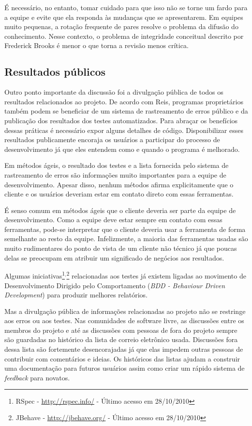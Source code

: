É necessário, no entanto, tomar cuidado para que isso não se torne um
fardo para a equipe e evite que ela responda às mudanças que se
apresentarem. Em equipes muito pequenas, a rotação frequente de pares
resolve o problema da difusão do conhecimento. Nesse contexto, o
problema de integridade conceitual descrito por Frederick Brooks
\cite{Brooks1975-mmme} é menor o que torna a revisão menos crítica.

\subsection{Resultados públicos}
\label{subsec:publicity}

Outro ponto importante da discussão foi a divulgação pública de todos
os resultados relacionados ao projeto. De acordo com Reis, programas
proprietários também podem se beneficiar de um sistema de rastreamento
de erros público e da publicação dos resultados dos testes
automatizados. Para abraçar os benefícios dessas práticas é necessário
expor alguns detalhes de código. Disponibilizar esses resultados
publicamente encoraja os usuários a participar do processo de
desenvolvimento já que eles entendem como e quando o programa é
melhorado.

Em métodos ágeis, o resultado dos testes e a lista fornecida pelo
sistema de rastreamento de erros são informações muito importantes
para a equipe de desenvolvimento. Apesar disso, nenhum métodos afirma
explicitamente que o cliente e os usuários deveriam estar em contato
direto com essas ferramentas.

É senso comum em métodos ágeis que o cliente deveria ser parte da
equipe de desenvolvimento. Como a equipe deve estar sempre em contato
com essas ferramentas, pode-se interpretar que o cliente deveria usar
a ferramenta de forma semelhante ao resto da equipe. Infelizmente, a
maioria das ferramentas usadas são muito rudimentares do ponto de
vista de um cliente não técnico já que poucas delas se preocupam em
atribuir um significado de negócios aos resultados.

Algumas iniciativas\footnote{RSpec - \url{http://rspec.info/} - Último
  acesso em 28/10/2010}$^{, }$\footnote{JBehave -
  \url{http://jbehave.org/} - Último acesso em 28/10/2010}
relacionadas aos testes já existem ligadas ao movimento de
Desenvolvimento Dirigido pelo Comportamento (\emph{BDD - Behaviour
  Driven Development}) \cite{North2006} para produzir melhores
relatórios.

Mas a divulgação pública de informações relacionadas ao projeto não se
restringe aos erros ou aos testes. Nas comunidades de software livre,
as discussões entre os membros do projeto e até as discussões com
pessoas de fora do projeto sempre são guardadas no histórico da lista
de correio eletrônico usada. Discussões fora dessa lista são
fortemente desencorajadas já que elas impedem outras pessoas de
contribuir com comentários e ideias. Os históricos das listas ajudam a
construir uma documentação para futuros usuários assim como criar um
rápido sistema de \emph{feedback} para novatos.

